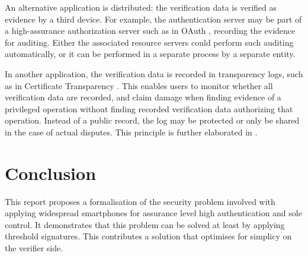 \documentclass[a4paper]{article}
\begin{document}
An alternative application is distributed: the verification data is verified as evidence by a third device. For example, the authentication server may be part of a high-assurance authorization server such as in OAuth \cite{rfc6749}, recording the evidence for auditing. Either the associated resource servers could perform such auditing automatically, or it can be performed in a separate process by a separate entity.

In another application, the verification data is recorded in transparency logs, such as in Certificate Transparency \cite{rfc9162}. This enables users to monitor whether all verification data are recorded, and claim damage when finding evidence of a privileged operation without finding recorded verification data authorizing that operation. Instead of a public record, the log may be protected or only be shared in the case of actual disputes. This principle is further elaborated in \cite{Verheul2024}.

\section{Conclusion}

This report proposes a formalisation of the security problem involved with applying widespread smartphones for assurance level high authentication and sole control. It demonstrates that this problem can be solved at least by applying threshold signatures. This contributes a solution that optimises for simplicy on the verifier side.

\printbibliography
\end{document}
